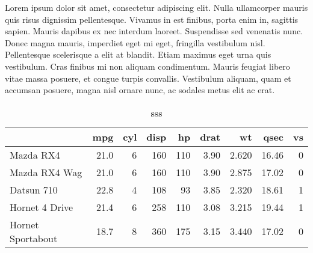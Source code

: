 \documentclass[]{article}
\newenvironment{Shaded}{\begin{snugshade}}{\end{snugshade}}
\newcommand{\KeywordTok}[1]{\textcolor[rgb]{0.13,0.29,0.53}{\textbf{{#1}}}}
\newcommand{\DataTypeTok}[1]{\textcolor[rgb]{0.13,0.29,0.53}{{#1}}}
\newcommand{\DecValTok}[1]{\textcolor[rgb]{0.00,0.00,0.81}{{#1}}}
\newcommand{\StringTok}[1]{\textcolor[rgb]{0.31,0.60,0.02}{{#1}}}
\newcommand{\NormalTok}[1]{{#1}}
\begin{document}
Lorem ipsum dolor sit amet, consectetur adipiscing elit. Nulla
ullamcorper mauris quis risus dignissim pellentesque. Vivamus in est
finibus, porta enim in, sagittis sapien. Mauris dapibus ex nec interdum
laoreet. Suspendisse sed venenatis nunc. Donec magna mauris, imperdiet
eget mi eget, fringilla vestibulum nisl. Pellentesque scelerisque a elit
at blandit. Etiam maximus eget urna quis vestibulum. Cras finibus mi non
aliquam condimentum. Mauris feugiat libero vitae massa posuere, et
congue turpis convallis. Vestibulum aliquam, quam et accumsan posuere,
magna nisl ornare nunc, ac sodales metus elit ac erat.

\begin{Shaded}
\end{Shaded}


\begin{wraptable}{l}{12.45cm}

\caption{\label{tab:unnamed-chunk-6}sss}
\centering
\fontsize{6}{8}\selectfont
\begin{tabular}[t]{lrrrrrrrr}
\toprule
  & mpg & cyl & disp & hp & drat & wt & qsec & vs\\
\midrule
Mazda RX4 & 21.0 & 6 & 160 & 110 & 3.90 & 2.620 & 16.46 & 0\\
Mazda RX4 Wag & 21.0 & 6 & 160 & 110 & 3.90 & 2.875 & 17.02 & 0\\
Datsun 710 & 22.8 & 4 & 108 & 93 & 3.85 & 2.320 & 18.61 & 1\\
Hornet 4 Drive & 21.4 & 6 & 258 & 110 & 3.08 & 3.215 & 19.44 & 1\\
Hornet Sportabout & 18.7 & 8 & 360 & 175 & 3.15 & 3.440 & 17.02 & 0\\
\bottomrule
\end{tabular}
\end{wraptable}

\end{document}
